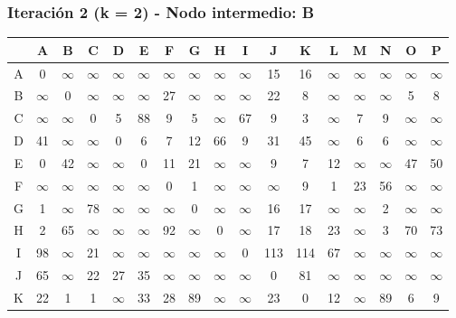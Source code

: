 \documentclass[12pt]{article}
\begin{document}
\subsubsection{Iteración 2 (k = 2) - Nodo intermedio: B}
\begin{table}[h!]
\centering
\begin{tabular}{|c|c|c|c|c|c|c|c|c|c|c|c|c|c|c|c|c|}
\hline
 & A & B & C & D & E & F & G & H & I & J & K & L & M & N & O & P \\\hline
A & 0 & $\infty$ & $\infty$ & $\infty$ & $\infty$ & $\infty$ & $\infty$ & $\infty$ & $\infty$ & 15 & 16 & $\infty$ & $\infty$ & $\infty$ & $\infty$ & $\infty$ \\\hline
B & $\infty$ & 0 & $\infty$ & $\infty$ & $\infty$ & 27 & $\infty$ & $\infty$ & $\infty$ & 22 & 8 & $\infty$ & $\infty$ & $\infty$ & 5 & 8 \\\hline
C & $\infty$ & $\infty$ & 0 & 5 & 88 & 9 & 5 & $\infty$ & 67 & 9 & 3 & $\infty$ & 7 & 9 & $\infty$ & $\infty$ \\\hline
D & 41 & $\infty$ & $\infty$ & 0 & 6 & 7 & 12 & 66 & 9 & 31 & 45 & $\infty$ & 6 & 6 & $\infty$ & $\infty$ \\\hline
E & 0 & 42 & $\infty$ & $\infty$ & 0 & 11 & 21 & $\infty$ & $\infty$ & 9 & 7 & 12 & $\infty$ & $\infty$ & \cellcolor{lightgreen} 47 & \cellcolor{lightgreen} 50 \\\hline
F & $\infty$ & $\infty$ & $\infty$ & $\infty$ & $\infty$ & 0 & 1 & $\infty$ & $\infty$ & $\infty$ & 9 & 1 & 23 & 56 & $\infty$ & $\infty$ \\\hline
G & 1 & $\infty$ & 78 & $\infty$ & $\infty$ & $\infty$ & 0 & $\infty$ & $\infty$ & 16 & 17 & $\infty$ & $\infty$ & 2 & $\infty$ & $\infty$ \\\hline
H & 2 & 65 & $\infty$ & $\infty$ & $\infty$ & \cellcolor{lightgreen} 92 & $\infty$ & 0 & $\infty$ & 17 & 18 & 23 & $\infty$ & 3 & \cellcolor{lightgreen} 70 & \cellcolor{lightgreen} 73 \\\hline
I & 98 & $\infty$ & 21 & $\infty$ & $\infty$ & $\infty$ & $\infty$ & $\infty$ & 0 & 113 & 114 & 67 & $\infty$ & $\infty$ & $\infty$ & $\infty$ \\\hline
J & 65 & $\infty$ & 22 & 27 & 35 & $\infty$ & $\infty$ & $\infty$ & $\infty$ & 0 & 81 & $\infty$ & $\infty$ & $\infty$ & $\infty$ & $\infty$ \\\hline
K & 22 & 1 & 1 & $\infty$ & 33 & \cellcolor{lightgreen} 28 & 89 & $\infty$ & $\infty$ & \cellcolor{lightgreen} 23 & 0 & 12 & $\infty$ & 89 & \cellcolor{lightgreen} 6 & \cellcolor{lightgreen} 9 \\\hline

\end{tabular}
\end{table}
\end{document}
